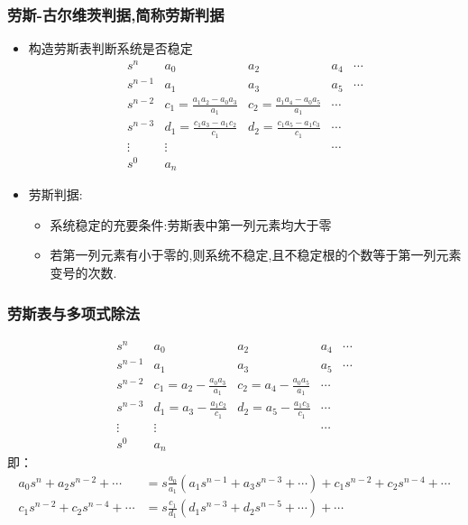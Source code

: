 \documentclass{beamer}
\begin{document}
\begin{frame}
\frametitle{劳斯-古尔维茨判据,简称劳斯判据}
\label{sec-2-3}

\begin{itemize}
\item <2->构造劳斯表判断系统是否稳定
     \begin{equation*}
     \begin{matrix}
     s^{n}   &  a_{0}  &  a_{2}  & a_{4}  & \cdots  \\
     s^{n-1} &  a_{1}  & a_{3}   & a_{5}  & \cdots  \\
     s^{n-2} &  c_{1}=\frac{a_1 a_2 - a_0 a_3}{a_1} &  c_{2}=\frac{a_1 a_4 - a_0 a_5}{a_1} & \cdots \\
     s^{n-3} &  d_{1}=\frac{c_1 a_3 - a_1 c_2}{c_1} &  d_{2}=\frac{c_1 a_5 - a_1 c_3}{c_1} & \cdots \\
     \vdots  &   \vdots                             &                                      & \cdots  \\
     s^{0}   &   a_{n}                              &                                      &
     \end{matrix}
     \end{equation*}
\item <3->劳斯判据:
\begin{itemize}
\item <4->系统稳定的充要条件:劳斯表中第一列元素均大于零
\item <5->若第一列元素有小于零的,则系统不稳定,且不稳定根的个数等于第一列元素变号的次数.
\end{itemize}
\end{itemize}
\end{frame}
\begin{frame}
\frametitle{劳斯表与多项式除法}
\label{sec-2-4}

\begin{equation*}
     \begin{matrix}
     s^{n}   &  a_{0}  &  a_{2}  & a_{4}  & \cdots  \\
     s^{n-1} &  a_{1}  & a_{3}   & a_{5}  & \cdots  \\
     s^{n-2} &  c_{1}=a_2 -\frac{ a_0 a_3}{a_1} &  c_{2}=a_4 - \frac{a_0 a_5}{a_1} & \cdots \\
     s^{n-3} &  d_{1}=a_3 -\frac{ a_1 c_2}{c_1} &  d_{2}=a_5 -\frac{ a_1 c_3}{c_1} & \cdots \\
     \vdots  &   \vdots                             &                                      & \cdots  \\
     s^{0}   &   a_{n}                              &                                      &
     \end{matrix}
\end{equation*}
即：
\begin{align*}
    a_0 s^n+a_2 s^{n-2}+\cdots &= s \frac{a_0}{a_1}(a_1 s^{n-1}+a_3 s^{n-3}+\cdots)+c_1 s^{n-2}+c_2 s^{n-4}+\cdots\\
    c_1 s^{n-2}+c_2 s^{n-4}+\cdots &=s \frac{c_1}{d_1}(d_1 s^{n-3}+d_2 s^{n-5}+\cdots)+\cdots
\end{align*}
\end{frame}
\end{document}
